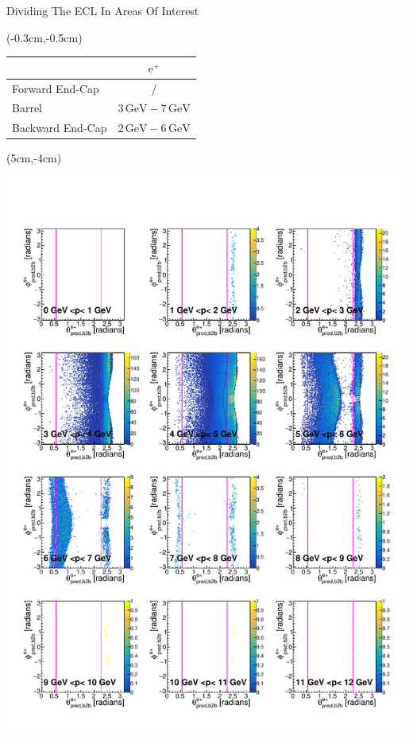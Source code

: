 \documentclass[8pt]{beamer}
\begin{document}
\begin{frame}{Dividing The ECL In Areas Of Interest}
	\pause[2]
	
	\begin{textblock*}{5cm}(-0.3cm,-0.5cm)
		
		
		\begin{table}[h!]
			\centering
			\begin{tabular}{lc}
				&$\textrm{e}^+$\\
				\hline
				Forward End-Cap &/\\
				Barrel &$3\,\textrm{GeV} - 7\,\textrm{GeV}$\\
				Backward End-Cap & $2\,\textrm{GeV} - 6\,\textrm{GeV}$\\	
			\end{tabular}

		\end{table}
		
	\end{textblock*}
	
	
	\begin{textblock*}{6.5cm}(5cm,-4cm)
		\includegraphics[width=\textwidth]{VBilder/RTPMepD_MC}
	\end{textblock*}
	

\end{frame}
\end{document}
